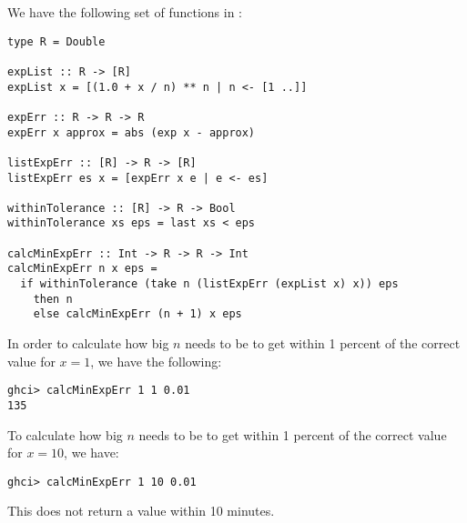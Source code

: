 
We have the following set of functions in :
\begin{verbatim}
type R = Double

expList :: R -> [R]
expList x = [(1.0 + x / n) ** n | n <- [1 ..]]

expErr :: R -> R -> R
expErr x approx = abs (exp x - approx)

listExpErr :: [R] -> R -> [R]
listExpErr es x = [expErr x e | e <- es]

withinTolerance :: [R] -> R -> Bool
withinTolerance xs eps = last xs < eps

calcMinExpErr :: Int -> R -> R -> Int
calcMinExpErr n x eps =
  if withinTolerance (take n (listExpErr (expList x) x)) eps
    then n
    else calcMinExpErr (n + 1) x eps
\end{verbatim}
In order to calculate how big $n$ needs to be to get within 1 percent of the correct 
value for $x = 1$, we have the following:
\begin{verbatim}
ghci> calcMinExpErr 1 1 0.01
135
\end{verbatim}
To calculate how big $n$ needs to be to get within 1 percent of the correct value for
$x = 10$, we have:
\begin{verbatim}
ghci> calcMinExpErr 1 10 0.01
\end{verbatim}
This does not return a value within 10 minutes.
